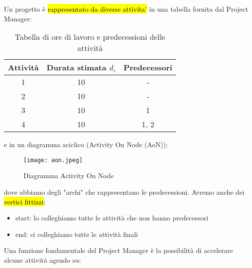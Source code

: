Un progetto è \hl{rappresentato da diverse attivita'} in una tabella fornita dal Project Manager:


\begin{table}[h!]
	\begin{center}
	\begin{tabular}{|c | c c |} 
		\hline
		Attività & Durata stimata $d_i$ & Predecessori \\ [0.5ex]
		\hline
 		1 & 10 & - \\
		2 & 10 & - \\
		3 & 10 & 1 \\
		4 & 10 & 1, 2 \\
		\hline
		\end{tabular}
	\end{center}
	\caption{Tabella di ore di lavoro e predecessioni delle attività}
	\label{tabatt}
\end{table}


e in un diagramma aciclico (Activity On Node (AoN)):


\begin{figure}[H]
\centering
\texttt{[image: aon.jpeg]}
\caption{Diagramma Activity On Node} 
\label{aon}
\end{figure}


dove abbiamo degli "archi" che rappresentano le predecessioni. Avremo anche dei \hl{vertici fittizzi}:

\begin{itemize}
	\item start: lo colleghiamo tutte le attività che non hanno predecessori
	\item end: ci colleghiamo tutte le attività finali
\end{itemize}

Una funzione fondamentale del Project Manager è la possibilità di accelerare alcune attività agendo su:


